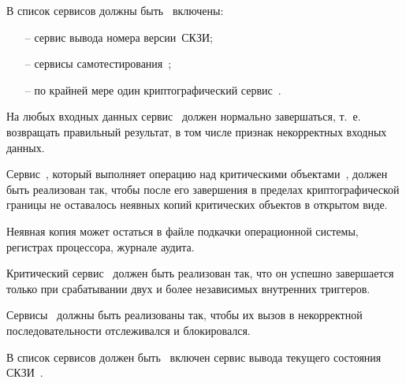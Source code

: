 \label{R.SV.Oblig}
В список сервисов должны быть~ включены:
\begin{itemize}
\item[--]
сервис вывода номера версии~СКЗИ;
\item[--]
сервисы самотестирования~;
\item[--]
по крайней мере один криптографический сервис~.
\end{itemize}

\label{R.SV.Robust}
На любых входных данных сервис~ должен нормально 
завершаться, т.~е. возвращать правильный результат,  
в том числе признак некорректных входных данных.

\label{R.SV.Leaks}
Сервис~, который выполняет операцию над критическими
объектами~, должен быть реализован так, чтобы после его
завершения в пределах криптографической границы не оставалось 
неявных копий критических объектов в открытом виде.

\begin{note*}
Неявная копия может остаться в файле подкачки операционной системы, 
регистрах процессора, журнале аудита. 
\end{note*}

\label{R.SV.Crit}
Критический сервис~ должен быть реализован так,
что он успешно завершается только при срабатывании двух и более 
независимых внутренних триггеров.

\label{R.SV.Seq}
Сервисы~ должны быть реализованы так, чтобы их вызов в
некорректной последовательности отслеживался и блокировался.

\label{R.SV.Status}
В список сервисов должен быть~ включен
сервис вывода текущего состояния СКЗИ~.

